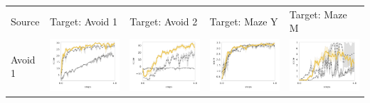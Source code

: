 \begin{table}
     \begin{tabular}{m{} >{\centering}m{} >{\centering}m{} >{\centering}m{} >{\centering\arraybackslash}m{} }
	Source & Target: Avoid 1 & Target: Avoid 2 & Target: Maze Y & Target: Maze M \\
     	
	Avoid 1 &
        \includegraphics[width=.22\textwidth]{figures/app_plots/lab/sa1/seekavoid_arena_01} &
        \includegraphics[width=.22\textwidth]{figures/app_plots/lab/sa1/seekavoid_arena_02} &
        \includegraphics[width=.22\textwidth]{figures/app_plots/lab/sa1/seek_maze_y_01} &
        \includegraphics[width=.22\textwidth]{figures/app_plots/lab/sa1/seek_maze_m_01} \\


\end{tabular}
\end{table}
